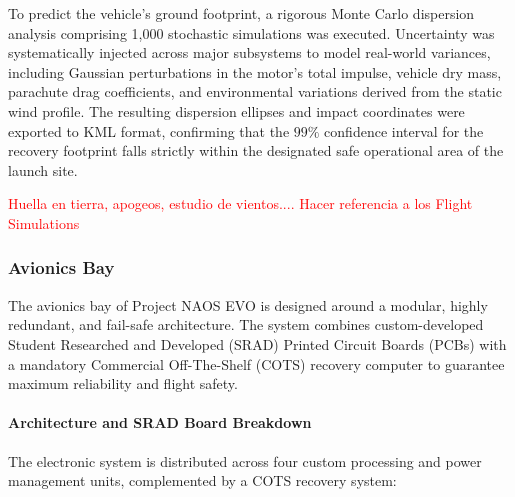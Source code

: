 \documentclass[11pt, a4paper]{article} %
\begin{document}
To predict the vehicle's ground footprint, a rigorous Monte Carlo dispersion analysis comprising 1,000 stochastic simulations was executed. Uncertainty was systematically injected across major subsystems to model real-world variances, including Gaussian perturbations in the motor's total impulse, vehicle dry mass, parachute drag coefficients, and environmental variations derived from the static wind profile. The resulting dispersion ellipses and impact coordinates were exported to KML format, confirming that the $99\%$ confidence interval for the recovery footprint falls strictly within the designated safe operational area of the launch site.


\vspace{1cm}

\textcolor{red}{Huella en tierra, apogeos, estudio de vientos.... Hacer referencia a los Flight Simulations}

\subsubsection{Avionics Bay}
\label{subsubsection:avionics_bay}

The avionics bay of Project NAOS EVO is designed around a modular, highly redundant, and fail-safe architecture. The system combines custom-developed Student Researched and Developed (SRAD) Printed Circuit Boards (PCBs) with a mandatory Commercial Off-The-Shelf (COTS) recovery computer to guarantee maximum reliability and flight safety. 

\paragraph{Architecture and SRAD Board Breakdown}
The electronic system is distributed across four custom processing and power management units, complemented by a COTS recovery system:
\end{document}
